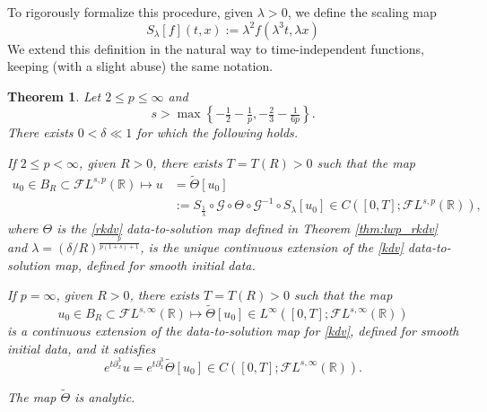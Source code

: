 \documentclass[%
11pt,  reqno]{amsart}
\newcommand{\red}{\color{red}}
\newcommand{\5}{\textup{V}}
\newcommand{\noi}{\noindent}
\newcommand{\FL}{\mathcal{F} L}
\newcommand{\wt}{\widetilde}
\newcommand{\dx}{\partial_x}
\newtheorem{theorem}{Theorem} [section]
\theoremstyle{remark}
\newcommand{\R}{\mathbb{R}}
\newcommand{\Gc}{\mathcal{G}}
\numberwithin{equation}{section}
\numberwithin{theorem}{section}
\newcommand{\simao}[1]{\marginpar{\color{red} $\Leftarrow\Leftarrow\Leftarrow$}{\smallskip \noi\color{red}SIMAO: #1}\smallskip}
\begin{document}
To rigorously formalize this procedure,  given $\lambda>0$, we define the scaling map
   \begin{equation}
    \label{SR}
    S_\lambda[f](t,x) := \lambda^2 f(\lambda^3 t, \lambda x)
   \end{equation}
We extend this definition in the natural way to time-independent functions, keeping (with a slight abuse) the same notation.


\begin{theorem}\label{thm:wp_kdv_intro} Let $2\le p\le \infty$ and
$$s>\max\left\{-\tfrac12 - \tfrac1p, -\tfrac23-\tfrac1{6p}\right\}.$$
There exists $0<\delta\ll 1$ for which the following holds.

\noi{\rm(i)} If $2 \le p<\infty$, given $R>0$, there exists $T=T(R)>0$ such that the map
\begin{align}
u_0\in B_R\subset\FL^{s,p}(\R)\mapsto u& 
=\wt\Theta[u_0] 
\\
&:= S_{\frac1\lambda}\circ\mathcal{G}\circ\Theta  \circ \Gc^{-1}\circ S_\lambda[u_0]\in C([0,T];\FL^{s,p}(\R)),
\end{align}
where $\Theta$ is the \eqref{rkdv} data-to-solution map defined in Theorem \ref{thm:lwp_rkdv} and $\lambda=\left(\delta/R\right)^{\frac{p}{p(1+s)+1}}$,
is the unique continuous extension of the \eqref{kdv} data-to-solution map, defined for smooth initial data.

\smallskip

\noi{\rm(ii)} If $p=\infty$, given $R>0$, there exists $T=T(R)>0$ such that the map
\begin{equation}
u_0\in B_R\subset\FL^{s,\infty}(\R)\mapsto \wt\Theta[u_0]  \in L^\infty([0,T];\FL^{s,\infty}(\R))
\end{equation}
is a continuous extension of 
the data-to-solution map for \eqref{kdv}, defined for smooth initial data, and it satisfies
\begin{equation}
e^{t\dx^3} u = e^{t\dx^3} \wt\Theta[u_0] \in C([0,T] ; \FL^{s,\infty}(\R))
.
\end{equation}

{\red \noi{\rm(iii)} The map $\tilde{\Theta}$ is analytic.}
	\end{theorem}
\end{document}
